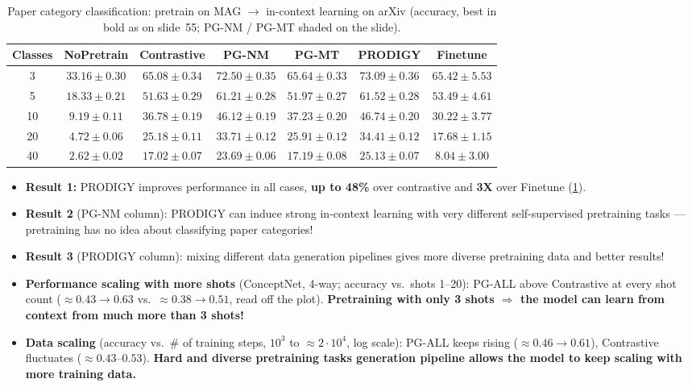 \begin{table}[htbp]
  \centering\small
  \caption{Paper category classification: pretrain on MAG $\to$ in-context learning on
  arXiv (accuracy, best in bold as on slide~55; PG-NM / PG-MT shaded on the slide).}
  \label{tab:lec14-arxiv}
  \begin{tabular}{@{}cccccc|c@{}}
    \toprule
    Classes & NoPretrain & Contrastive & PG-NM & PG-MT & PRODIGY & Finetune\\
    \midrule
    3  & $33.16\pm0.30$ & $65.08\pm0.34$ & $72.50\pm0.35$ & $65.64\pm0.33$
       & $\mathbf{73.09\pm0.36}$ & $65.42\pm5.53$\\
    5  & $18.33\pm0.21$ & $51.63\pm0.29$ & $61.21\pm0.28$ & $51.97\pm0.27$
       & $\mathbf{61.52\pm0.28}$ & $53.49\pm4.61$\\
    10 & $9.19\pm0.11$  & $36.78\pm0.19$ & $46.12\pm0.19$ & $37.23\pm0.20$
       & $\mathbf{46.74\pm0.20}$ & $30.22\pm3.77$\\
    20 & $4.72\pm0.06$  & $25.18\pm0.11$ & $33.71\pm0.12$ & $25.91\pm0.12$
       & $\mathbf{34.41\pm0.12}$ & $17.68\pm1.15$\\
    40 & $2.62\pm0.02$  & $17.02\pm0.07$ & $23.69\pm0.06$ & $17.19\pm0.08$
       & $\mathbf{25.13\pm0.07}$ & $8.04\pm3.00$\\
    \bottomrule
  \end{tabular}
\end{table}

\begin{itemize}
  \item \textbf{Result 1:} PRODIGY improves performance in all cases, \textbf{up to 48\%}
    over contrastive and \textbf{3X} over Finetune (\cref{tab:lec14-arxiv}).
  \item \textbf{Result 2} (PG-NM column): PRODIGY can induce strong in-context learning
    with very different self-supervised pretraining tasks --- pretraining has no idea
    about classifying paper categories!
  \item \textbf{Result 3} (PRODIGY column): mixing different data generation pipelines
    gives more diverse pretraining data and better results!
  \item \textbf{Performance scaling with more shots} (ConceptNet, 4-way; accuracy vs.\
    shots 1--20): PG-ALL above Contrastive at every shot count ($\approx0.43\to0.63$ vs.\
    $\approx0.38\to0.51$, read off the plot). \textbf{Pretraining with only 3 shots
    $\Rightarrow$ the model can learn from context from much more than 3 shots!}
  \item \textbf{Data scaling} (accuracy vs.\ \# of training steps, $10^3$ to $\approx2\cdot
    10^4$, log scale): PG-ALL keeps rising ($\approx0.46\to0.61$), Contrastive fluctuates
    ($\approx0.43$--$0.53$). \textbf{Hard and diverse pretraining tasks generation pipeline
    allows the model to keep scaling with more training data.}
\end{itemize}

